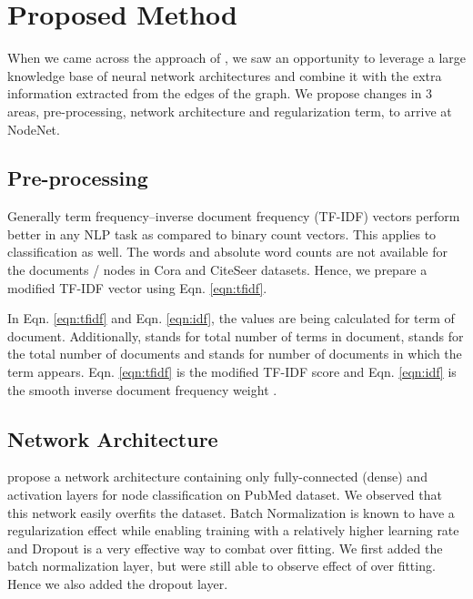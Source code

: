 \documentclass{article}
\begin{document}
\section{Proposed Method}

 When we came across the approach of \citet{10.1145/3159652.3159731}, we saw an opportunity to leverage a large knowledge base of neural network architectures and combine it with the extra information extracted from the edges of the graph. We propose changes in 3 areas, pre-processing, network architecture and regularization term, to arrive at NodeNet.

\subsection{Pre-processing}

Generally term frequency–inverse document frequency (TF-IDF) \cite{10.5555/553876} vectors perform better in any NLP task as compared to binary count vectors. This applies to classification as well. The words and absolute word counts are not available for the documents / nodes in Cora and CiteSeer datasets. Hence, we prepare a modified TF-IDF vector using Eqn. \ref{eqn:tfidf}.

In Eqn. \ref{eqn:tfidf} and Eqn. \ref{eqn:idf}, the values are being calculated for  term of  document. Additionally,  stands for total number of terms in  document,  stands for the total number of documents and  stands for number of documents in which the term  appears. Eqn. \ref{eqn:tfidf} is the modified TF-IDF \cite{manning_raghavan_schutze_2008} score and Eqn. \ref{eqn:idf} is the smooth inverse document frequency weight \cite{manning_raghavan_schutze_2008}.

\subsection{Network Architecture}

\citet{10.1145/3159652.3159731} propose a network architecture containing only fully-connected (dense) and activation layers for node classification on PubMed dataset. We observed that this network easily overfits the dataset. Batch Normalization is known to have a regularization effect while enabling training with a relatively higher learning rate \cite{ioffe2015batch} and Dropout \cite{9046288} is a very effective way to combat over fitting. We first added the batch normalization layer, but were still able to observe effect of over fitting. Hence we also added the dropout layer.
\end{document}
